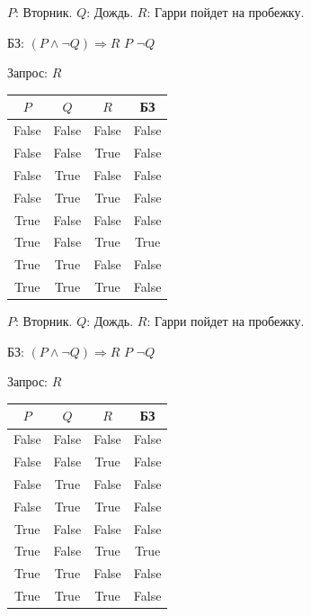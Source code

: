 \begin{frame}
$P$: Вторник. \;\;$Q$: Дождь. \;\;\;$R$: Гарри пойдет на пробежку.

		БЗ:  $(P∧¬Q)\Rightarrow R$ \;\;\;  $P$ \;\;\; $¬Q$

		Запрос: $R$
		\begin{table}
		\begin{tabular}{|c|c|c|c|}
			\hline\rowcolor{darkBlue}
			$P$ 	& $Q$	 & $R$	 & БЗ \\ \hline
			False 	&False 	& False	& False \\ \hline
			False & False & True & False	\\ \hline
			False	& True	& False	& False	\\ \hline
			False	&True	&True	& False\\ \hline
			True	&False	&False	&False\\ \hline 
			True	&False	&True	&True	\\ \hline
			True	&True	&False	&False	\\ \hline
			True	&True	&True	&False\\ \hline
		\end{tabular}
		\end{table} 
\end{frame}

\begin{frame}
$P$: Вторник. \;\;$Q$: Дождь. \;\;\;$R$: Гарри пойдет на пробежку.

		БЗ:  $(P∧¬Q)\Rightarrow R$ \;\;\;  $P$ \;\;\; $¬Q$

		Запрос: $R$
		\begin{table}
		\begin{tabular}{|c|c|c|c|}
			\hline
			\rowcolor{darkBlue}
			$P$ 	& $Q$	 & $R$	 & БЗ \\ \hline
			False 	&False 	& False	& False \\ \hline
			False & False & True & False	\\ \hline
			False	& True	& False	& False	\\ \hline
			False	&True	&True	& False\\ \hline
			True	&False	&False	&False\\ \hline 
			\rowcolor{Green}
			True	&False	&True	&True	\\ \hline
			True	&True	&False	&False	\\ \hline
			True	&True	&True	&False\\ \hline
		\end{tabular}
		\end{table} 
\end{frame}
